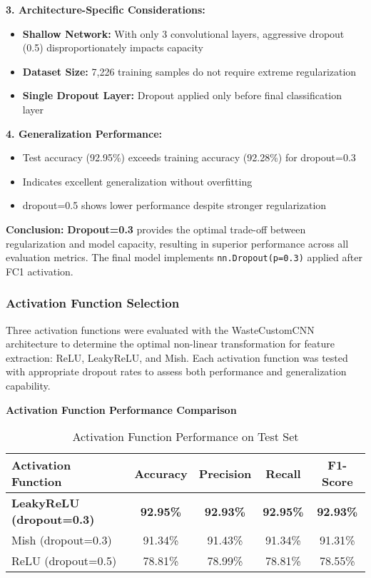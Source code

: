 \documentclass[12pt,a4paper]{article}
\begin{document}
\textbf{3. Architecture-Specific Considerations:}
\begin{itemize}
    \item \textbf{Shallow Network:} With only 3 convolutional layers, aggressive dropout (0.5) disproportionately impacts capacity
    \item \textbf{Dataset Size:} 7,226 training samples do not require extreme regularization
    \item \textbf{Single Dropout Layer:} Dropout applied only before final classification layer
\end{itemize}

\textbf{4. Generalization Performance:}
\begin{itemize}
    \item Test accuracy (92.95\%) exceeds training accuracy (92.28\%) for dropout=0.3
    \item Indicates excellent generalization without overfitting
    \item dropout=0.5 shows lower performance despite stronger regularization
\end{itemize}

\textbf{Conclusion:} \textbf{Dropout=0.3} provides the optimal trade-off between regularization and model capacity, resulting in superior performance across all evaluation metrics. The final model implements \texttt{nn.Dropout(p=0.3)} applied after FC1 activation.

\subsubsection{Activation Function Selection}

Three activation functions were evaluated with the WasteCustomCNN architecture to determine the optimal non-linear transformation for feature extraction: ReLU, LeakyReLU, and Mish. Each activation function was tested with appropriate dropout rates to assess both performance and generalization capability.

\textbf{Activation Function Performance Comparison}

\begin{table}[H]
\centering
\caption{Activation Function Performance on Test Set}
\begin{tabular}{lcccc}
\toprule
\textbf{Activation Function} & \textbf{Accuracy} & \textbf{Precision} & \textbf{Recall} & \textbf{F1-Score} \\
\midrule
\textbf{LeakyReLU (dropout=0.3)} & \textbf{92.95\%} & \textbf{92.93\%} & \textbf{92.95\%} & \textbf{92.93\%} \\
Mish (dropout=0.3) & 91.34\% & 91.43\% & 91.34\% & 91.31\% \\
ReLU (dropout=0.5) & 78.81\% & 78.99\% & 78.81\% & 78.55\% \\
\bottomrule
\end{tabular}
\end{table}
\end{document}
